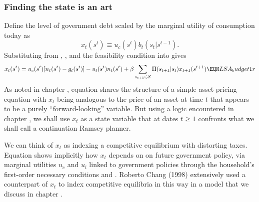 \subsubsection{Finding the state is an art}
 Define  the level of government debt
scaled by the marginal utility of consumption  today as
$$ x_t(s^t) \equiv u_c(s^t) b_t(s_t | s^{t-1}). $$
  Substituting from ,  ,  and the feasibility condition 
into  gives
$$   x_t(s^t)  = u_c(s^t) [ n_t(s^t) - g_t(s^t)]  - u_l (s^t) n_t(s^t) + \beta \sum_{s_{t+1}\in {\cal S}} \Pi (s_{t+1}| s_t) x_{t+1}(s^{t+1})
 \EQN LSA_budget1r $$
 As noted in chapter ,   equation  shares  the structure of
 a simple asset pricing equation with $x_t$ being analogous to the price of an asset at time $t$ that appears to be  a purely ``forward-looking'' variable.
   But using a logic encountered in chapter , we shall use $x_t$ as a state variable
 that at dates $t \geq 1$ confronts what we shall call a continuation Ramsey planner.  %

We can think of $x_t$ as indexing a competitive equilibrium with distorting taxes.  Equation  shows implicitly how $x_t$ depends on
on future government policy, via  marginal utilities $u_c$ and $u_l$  linked to government policies through the household's first-order necessary
conditions  and . Roberto Chang (1998) extensively used a counterpart of $x_t$ to index competitive equilibria in this way in a model that we
discuss in chapter .
%



